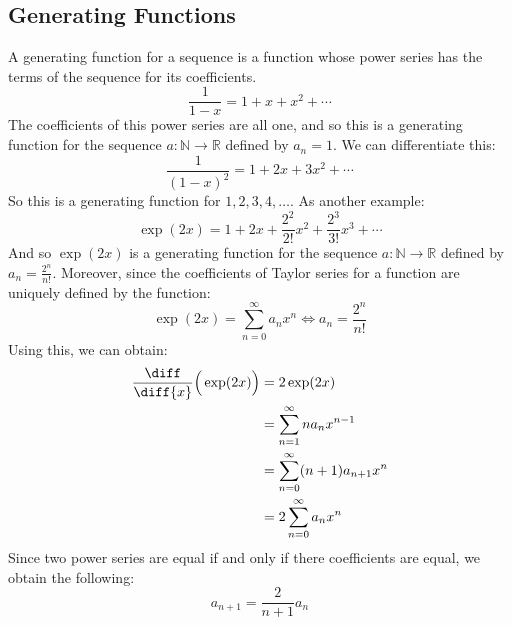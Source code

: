 \documentclass[crop=false,class=book,oneside]{standalone}
\begin{document}
        \subsection{Generating Functions}
            A generating function for a sequence is a function
            whose power series has the terms of the sequence
            for its coefficients.
            \begin{equation}
                \frac{1}{1-x}=1+x+x^{2}+\cdots
            \end{equation}
            The coefficients of this power series are all one,
            and so this is a generating function for the sequence
            $a:\mathbb{N}\rightarrow\mathbb{R}$ defined by
            $a_{n}=1$. We can differentiate this:
            \begin{equation}
                \frac{1}{(1-x)^{2}}=1+2x+3x^{2}+\cdots
            \end{equation}
            So this is a generating function for
            $1,2,3,4,\dots$. As another example:
            \begin{equation}
                \exp(2x)=1+2x+\frac{2^{2}}{2!}x^{2}
                +\frac{2^{3}}{3!}x^{3}+\cdots
            \end{equation}
            And so $\exp(2x)$ is a generating function for the
            sequence $a:\mathbb{N}\rightarrow\mathbb{R}$ defined by
            $a_{n}=\frac{2^{n}}{n!}$. Moreover, since the
            coefficients of Taylor series for a function are
            uniquely defined by the function:
            \begin{equation}
                \exp(2x)=\sum_{n=0}^{\infty}a_{n}x^{n}
                \Leftrightarrow{a}_{n}=\frac{2^{n}}{n!}
            \end{equation}
            Using this, we can obtain:
            \begin{align}
                \frac{\diff}{\diff{x}}\Big(\exp(2x)\Big)
                &=2\exp(2x)\\
                &=\sum_{n=1}^{\infty}na_{n}x^{n-1}\\
                &=\sum_{n=0}^{\infty}(n+1)a_{n+1}x^{n}\\
                &=2\sum_{n=0}^{\infty}a_{n}x^{n}
            \end{align}
            Since two power series are equal if and only if there
            coefficients are equal, we obtain the following:
            \begin{equation}
                a_{n+1}=\frac{2}{n+1}a_{n}
            \end{equation}
\end{document}
